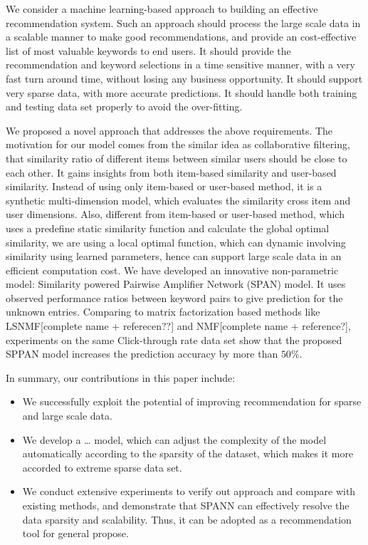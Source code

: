 \documentclass[conference,compsoc]{IEEEtran}
\begin{document}
We consider a machine learning-based approach to building an effective recommendation system. Such an approach should process the large scale data in a scalable manner to make good recommendations, and provide an cost-effective list of most valuable keywords to end users. It should provide the recommendation and keyword selections in a time sensitive manner, with a very fast turn around time, without losing any business opportunity.  It should support very sparse data, with more accurate predictions. It should handle both training and testing data set properly to avoid the over-fitting.  

 
We proposed a novel approach that addresses the above requirements. The motivation for our model comes from the similar idea as collaborative filtering, that similarity ratio of different items between similar users should be close to each other. It gains insights from both item-based similarity and user-based similarity. Instead of using only item-based or user-based method, it is a synthetic multi-dimension model, which evaluates the similarity cross item and user dimensions. Also, different from item-based or user-based method, which uses a predefine static similarity function and calculate the global optimal similarity,  we are using a local optimal function, which can  dynamic involving similarity using learned parameters, hence can support large scale data in an efficient computation cost.  We have developed an innovative non-parametric model: Similarity powered Pairwise Amplifier Network (SPAN) model. It uses observed performance ratios between keyword pairs to give prediction for the unknown entries. Comparing to matrix factorization based methods like LSNMF[complete name + referecen??] and NMF[complete name  + reference?], experiments on the same Click-through rate data set show that the proposed SPPAN model increases the prediction accuracy by more than $50\%$.


In summary, our contributions in this paper include: 
\begin{itemize} \itemsep -2pt
\item We successfully exploit the potential of improving recommendation for sparse and large scale data. 

\item We develop a … model,  which can adjust the complexity of the model automatically according to the sparsity 
of the dataset, which makes it more accorded to extreme sparse data set. 
\item We conduct extensive experiments to verify out approach and compare with existing methods, and demonstrate that SPANN can effectively resolve the data sparsity and scalability. Thus, it can be adopted as a recommendation tool for general propose. 
\end{itemize}
\end{document}
